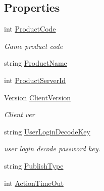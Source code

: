 \subsection*{Properties}
\begin{DoxyCompactItemize}
\item 
int \mbox{\hyperlink{class_t_net_1_1_config_1_1_app_server_section_a7befcfdd73e1ecd35eb22cf038e8a48c}{Product\+Code}}
\begin{DoxyCompactList}\small\item\em Game product code \end{DoxyCompactList}\item 
string \mbox{\hyperlink{class_t_net_1_1_config_1_1_app_server_section_a31e7c25229296cc27bf0e32b2bc070de}{Product\+Name}}
\item 
int \mbox{\hyperlink{class_t_net_1_1_config_1_1_app_server_section_a14d056b048df2ed0b6d6045b9796980c}{Product\+Server\+Id}}
\item 
Version \mbox{\hyperlink{class_t_net_1_1_config_1_1_app_server_section_a29de50a52fa72b67e3bb508a5ce26b49}{Client\+Version}}
\begin{DoxyCompactList}\small\item\em Client ver \end{DoxyCompactList}\item 
string \mbox{\hyperlink{class_t_net_1_1_config_1_1_app_server_section_a44ae7d47d60a06f4c05fbaa73545c523}{User\+Login\+Decode\+Key}}
\begin{DoxyCompactList}\small\item\em user login decode password key. \end{DoxyCompactList}\item 
string \mbox{\hyperlink{class_t_net_1_1_config_1_1_app_server_section_a87583674cc1fc9c26f17a42ea215a61f}{Publish\+Type}}
\item 
int \mbox{\hyperlink{class_t_net_1_1_config_1_1_app_server_section_ae0ad9e27fc376d0ace64cdae5d638973}{Action\+Time\+Out}}

\end{DoxyCompactItemize}
